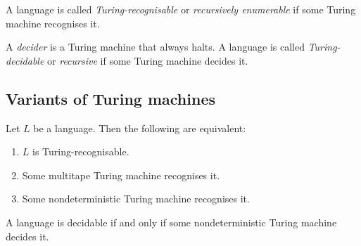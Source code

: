 \documentclass{article}
\begin{document}
\begin{definition}[Sipser p. 170]
    A language is called \emph{Turing-recognisable} or \emph{recursively enumerable}
    if some Turing machine recognises it.
\end{definition}

\begin{definition}[Sipser p. 170]
    A \emph{decider} is a Turing machine that always halts. A language is called 
    \emph{Turing-decidable} or \emph{recursive} if some Turing machine decides it.
\end{definition}

\subsection{Variants of Turing machines}

\begin{theorem}[Sipser p. 176-180]
    Let $L$ be a language. Then the following are equivalent:
    \begin{enumerate}
        \item $L$ is Turing-recognisable.
        \item Some multitape Turing machine recognises it.
        \item Some nondeterministic Turing machine recognises it.
    \end{enumerate}
\end{theorem}

\begin{corollary}[Sipser p. 180]
    A language is decidable if and only if some nondeterministic Turing machine 
    decides it.
\end{corollary}
\end{document}
